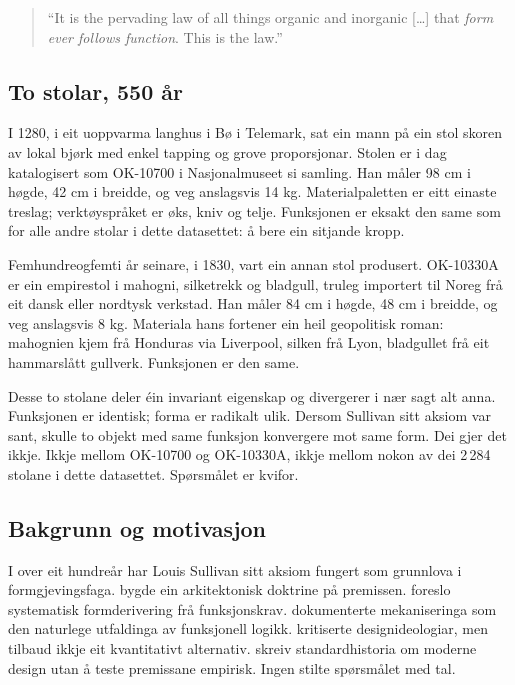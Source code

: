 \documentclass[10pt, a4paper, twocolumn]{article}
\begin{document}
\begin{quote}
``It is the pervading law of all things organic and inorganic [\ldots] that \emph{form ever follows function}. This is the law.'' \citep{sullivan1896}
\end{quote}

\subsection{To stolar, 550 år}

I 1280, i eit uoppvarma langhus i Bø i Telemark, sat ein mann på ein stol skoren av lokal bjørk med enkel tapping og grove proporsjonar. Stolen er i dag katalogisert som OK-10700 i Nasjonalmuseet si samling. Han måler 98 cm i høgde, 42 cm i breidde, og veg anslagsvis 14 kg. Materialpaletten er eitt einaste treslag; verktøyspråket er øks, kniv og telje. Funksjonen er eksakt den same som for alle andre stolar i dette datasettet: å bere ein sitjande kropp.

Femhundreogfemti år seinare, i 1830, vart ein annan stol produsert. OK-10330A er ein empirestol i mahogni, silketrekk og bladgull, truleg importert til Noreg frå eit dansk eller nordtysk verkstad. Han måler 84 cm i høgde, 48 cm i breidde, og veg anslagsvis 8 kg. Materiala hans fortener ein heil geopolitisk roman: mahognien kjem frå Honduras via Liverpool, silken frå Lyon, bladgullet frå eit hammarslått gullverk. Funksjonen er den same.

Desse to stolane deler éin invariant eigenskap og divergerer i nær sagt alt anna. Funksjonen er identisk; forma er radikalt ulik. Dersom Sullivan sitt aksiom var sant, skulle to objekt med same funksjon konvergere mot same form. Dei gjer det ikkje. Ikkje mellom OK-10700 og OK-10330A, ikkje mellom nokon av dei 2\,284 stolane i dette datasettet. Spørsmålet er kvifor.

\subsection{Bakgrunn og motivasjon}

I over eit hundreår har Louis Sullivan sitt aksiom fungert som grunnlova i formgjevingsfaga. \citet{lecorbusier1923} bygde ein arkitektonisk doktrine på premissen. \citet{alexander1964} foreslo systematisk formderivering frå funksjonskrav. \citet{giedion1948} dokumenterte mekaniseringa som den naturlege utfaldinga av funksjonell logikk. \citet{forty1986} kritiserte designideologiar, men tilbaud ikkje eit kvantitativt alternativ. \citet{raizman2010} skreiv standardhistoria om moderne design utan å teste premissane empirisk. Ingen stilte spørsmålet med tal.
\end{document}
